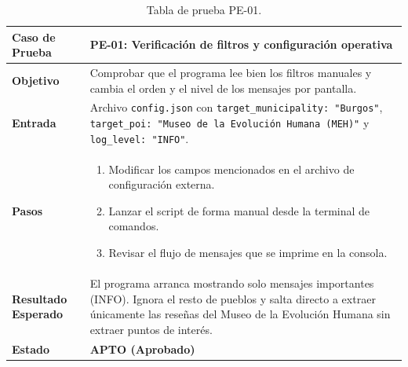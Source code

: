 \begin{table}[p]
	\centering
	\begin{tabularx}{\linewidth}{ p{} X }
		\toprule
		\textbf{Caso de Prueba} & \textbf{PE-01: Verificación de filtros y configuración operativa} \\
		\toprule
		\textbf{Objetivo}       & Comprobar que el programa lee bien los filtros manuales y cambia el orden y el nivel de los mensajes por pantalla. \\ \midrule
		\textbf{Entrada}        & Archivo \texttt{config.json} con \texttt{target\_municipality: "Burgos"}, \texttt{target\_poi: "Museo de la Evolución Humana (MEH)"} y \texttt{log\_level: "INFO"}. \\ \midrule
		\textbf{Pasos}          & 
		\begin{enumerate}
			\tightlist
			\item Modificar los campos mencionados en el archivo de configuración externa.
			\item Lanzar el script de forma manual desde la terminal de comandos.
			\item Revisar el flujo de mensajes que se imprime en la consola.
		\end{enumerate} \\ \midrule
		\textbf{Resultado Esperado} & El programa arranca mostrando solo mensajes importantes (INFO). Ignora el resto de pueblos y salta directo a extraer únicamente las reseñas del Museo de la Evolución Humana sin extraer puntos de interés. \\ \midrule
		\textbf{Estado}         & \textbf{APTO (Aprobado)} \\
		\bottomrule
	\end{tabularx}
	\caption{Tabla de prueba PE-01.}
\end{table}

